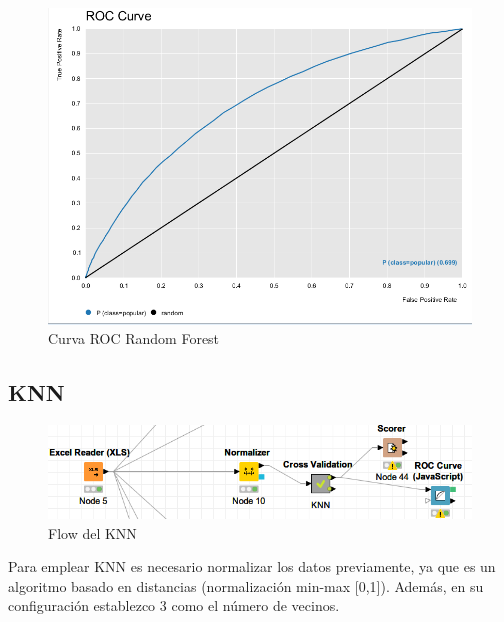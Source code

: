 \begin{figure}[H] %
	\centering
	\includegraphics[scale=0.335]{roc-rf-p.png}  %
	\caption{Curva ROC Random Forest} 
	\label{fig:rocrf-p}
\end{figure}

\subsection{KNN}

\begin{figure}[H] %
	\centering
	\includegraphics[scale=0.4]{flow-knn-p.png}  %
	\caption{Flow del KNN} 
	\label{fig:flow-knn}
\end{figure}

Para emplear KNN es necesario normalizar los datos previamente, ya que es un algoritmo basado en distancias (normalización min-max [0,1]). Además, en su configuración establezco 3 como el número de vecinos.

